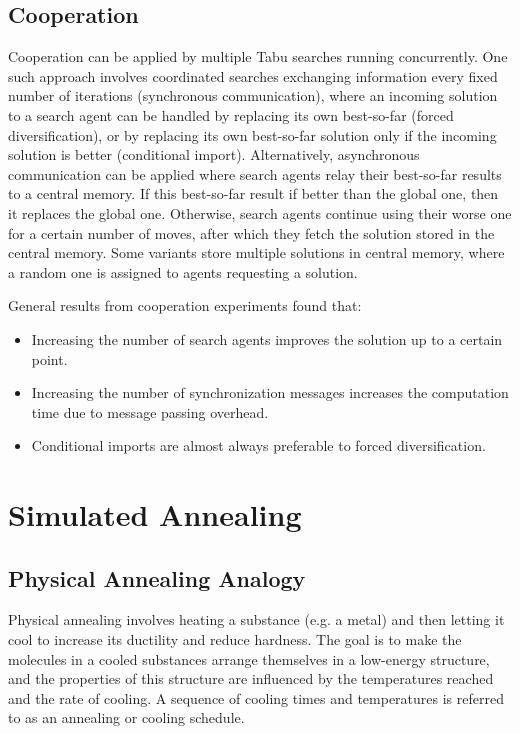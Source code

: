 \documentclass[12pt,titlepage]{article}
\begin{document}
    \subsection{Cooperation}
      Cooperation can be applied by multiple Tabu searches running concurrently. One such approach involves coordinated searches exchanging information every fixed number
      of iterations (synchronous communication), where an incoming solution to a search agent can be handled by replacing its own best-so-far (forced diversification),
      or by replacing its own best-so-far solution only if the incoming solution is better (conditional import). Alternatively, asynchronous communication can be applied
      where search agents relay their best-so-far results to a central memory. If this best-so-far result if better than the global one, then it replaces the global one.
      Otherwise, search agents continue using their worse one for a certain number of moves, after which they fetch the solution stored in the central memory. Some variants
      store multiple solutions in central memory, where a random one is assigned to agents requesting a solution.

      General results from cooperation experiments found that:
      \begin{itemize}
        \item Increasing the number of search agents improves the solution up to a certain point.
        \item Increasing the number of synchronization messages increases the computation time due to message passing overhead.
        \item Conditional imports are almost always preferable to forced diversification.
      \end{itemize}

  \newpage

  \section{Simulated Annealing}

    \subsection{Physical Annealing Analogy}
      Physical annealing involves heating a substance (e.g. a metal) and then letting it cool to increase its ductility and reduce hardness. The goal is to make the molecules
      in a cooled substances arrange themselves in a low-energy structure, and the properties of this structure are influenced by the temperatures reached and the rate of cooling.
      A sequence of cooling times and temperatures is referred to as an annealing or cooling schedule.
\end{document}
